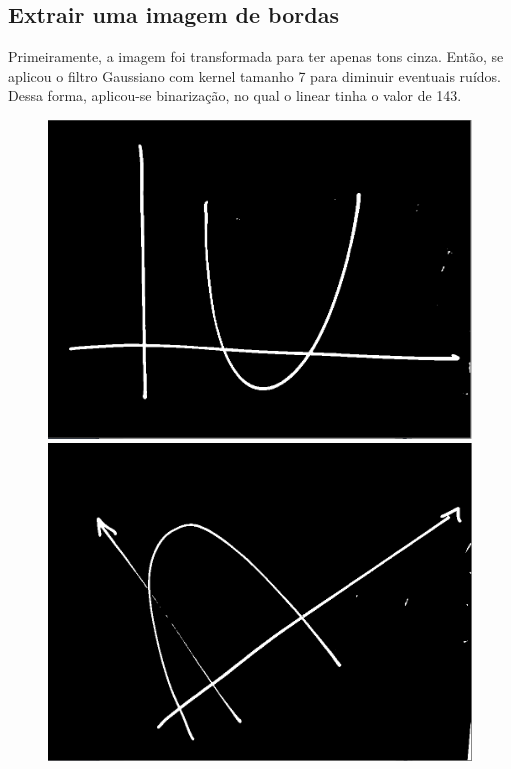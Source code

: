 \documentclass{article}
\begin{document}
   \subsection{Extrair uma imagem de bordas}
   Primeiramente, a imagem foi transformada para ter apenas tons cinza. Então, se aplicou o filtro Gaussiano com kernel tamanho 7 para diminuir eventuais ruídos. Dessa forma, aplicou-se binarização, no qual o linear tinha o valor de 143.
   \begin{figure}[h!]
   \centering
    \subfigure
        {\includegraphics[scale=0.17]{exemplo1_edge.PNG}}
    \subfigure
        {\includegraphics[scale=0.17]{exemplo2_edge.PNG}}
    \subfigure

\end{figure}
\end{document}
